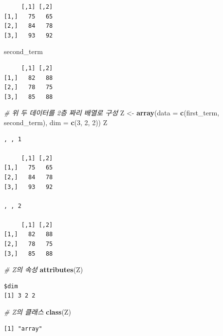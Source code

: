 \documentclass[
  11pt,
]{krantz}
\newenvironment{Shaded}{\begin{snugshade}}{\end{snugshade}}
\newcommand{\CommentTok}[1]{\textcolor[rgb]{0.37,0.37,0.37}{\textit{#1}}}
\newcommand{\DataTypeTok}[1]{\textcolor[rgb]{0.27,0.27,0.27}{#1}}
\newcommand{\DecValTok}[1]{\textcolor[rgb]{0.06,0.06,0.06}{#1}}
\newcommand{\KeywordTok}[1]{\textcolor[rgb]{0.27,0.27,0.27}{\textbf{#1}}}
\newcommand{\NormalTok}[1]{#1}
\newcommand{\StringTok}[1]{\textcolor[rgb]{0.5,0.5,0.5}{#1}}
\begin{document}
\begin{verbatim}
     [,1] [,2]
[1,]   75   65
[2,]   84   78
[3,]   93   92
\end{verbatim}

\begin{Shaded}
\begin{Highlighting}[]
\NormalTok{second_term}
\end{Highlighting}
\end{Shaded}

\begin{verbatim}
     [,1] [,2]
[1,]   82   88
[2,]   78   75
[3,]   85   88
\end{verbatim}

\begin{Shaded}
\begin{Highlighting}[]
\CommentTok{# 위 두 데이터를 2층 짜리 배열로 구성}
\NormalTok{Z <-}\StringTok{ }\KeywordTok{array}\NormalTok{(}\DataTypeTok{data =} \KeywordTok{c}\NormalTok{(first_term, second_term), }
           \DataTypeTok{dim =} \KeywordTok{c}\NormalTok{(}\DecValTok{3}\NormalTok{, }\DecValTok{2}\NormalTok{, }\DecValTok{2}\NormalTok{))}
\NormalTok{Z}
\end{Highlighting}
\end{Shaded}

\begin{verbatim}
, , 1

     [,1] [,2]
[1,]   75   65
[2,]   84   78
[3,]   93   92

, , 2

     [,1] [,2]
[1,]   82   88
[2,]   78   75
[3,]   85   88
\end{verbatim}

\begin{Shaded}
\begin{Highlighting}[]
\CommentTok{# Z의 속성}
\KeywordTok{attributes}\NormalTok{(Z)}
\end{Highlighting}
\end{Shaded}

\begin{verbatim}
$dim
[1] 3 2 2
\end{verbatim}

\begin{Shaded}
\begin{Highlighting}[]
\CommentTok{# Z의 클래스}
\KeywordTok{class}\NormalTok{(Z)}
\end{Highlighting}
\end{Shaded}

\begin{verbatim}
[1] "array"
\end{verbatim}
\end{document}
